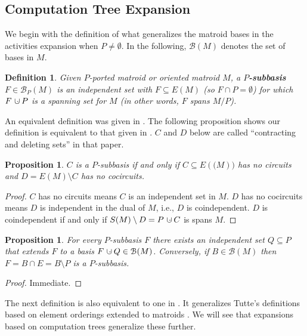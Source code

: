 \documentclass[12pt,leqno]{amsart}
\newtheorem{prop}[lem]{Proposition}
\newtheorem{definition}[lem]{Definition}
\theoremstyle{remark}
\newcommand{\dunion}
{\mbox{\hbox{\hskip6pt$\cdot$\hskip-5.50pt$\cup$\hskip2pt}}}
\begin{document}
\subsection{Computation Tree Expansion}

We begin with the definition of what generalizes the matroid
bases in the activities expansion when $P\neq\emptyset$.  In the
following, $\mathcal{B}(M)$ denotes the set of bases in $M$.

\begin{definition}
Given $P$-ported matroid or oriented matroid $M$,
a \textbf{$P$-subbasis} $F\in \mathcal{B}_P(M)$
is an independent set  with $F\subseteq E(M)$
(so $F\cap P=\emptyset$) for which $F\dunion P$ is a spanning set
for $M$
(in other words, $F$ spans $M/P$).
\end{definition}

An equivalent definition was given in \cite{SetPointedLV}.
The following proposition shows our definition is equivalent to
that given in \cite{RelTuttePoly}.  $C$ and $D$ below are called 
``contracting and deleting sets'' in that paper.

\begin{prop}
$C$ is a $P$-subbasis if and only if
$C \subseteq E(\mathcal(M))$ has no circuits and 
$D=E(M)\setminus C$ has no cocircuits.
\end{prop}

\begin{proof}
$C$ has no circuits means $C$ is an independent set in 
$M$.
$D$ has no cocircuits means $D$ is independent in
the dual of $M$, i.e., $D$ is coindependent.  
$D$ is coindependent if and only if
$S(M)\setminus D=P\dunion C$ is spans
$M$.
\end{proof}


\begin{prop}
For every $P$-subbasis $F$ there exists an independent set $Q\subseteq P$
that extends $F$ to a basis $F\dunion Q\in \mathcal{B}(M)$.
Conversely, if $B\in\mathcal{B}(M)$ then $F=B\cap E=B\setminus P$
is a $P$-subbasis.
\end{prop}

\begin{proof} Immediate. \end{proof}


The next definition 
is also equivalent to one in \cite{RelTuttePoly}. It generalizes
Tutte's definitions based on element orderings \cite{TutteGraphBook,TutteDich} 
extended to
matroids \cite{CrapoAct}.  We will see that expansions based on 
computation trees generalize these further.
\end{document}
